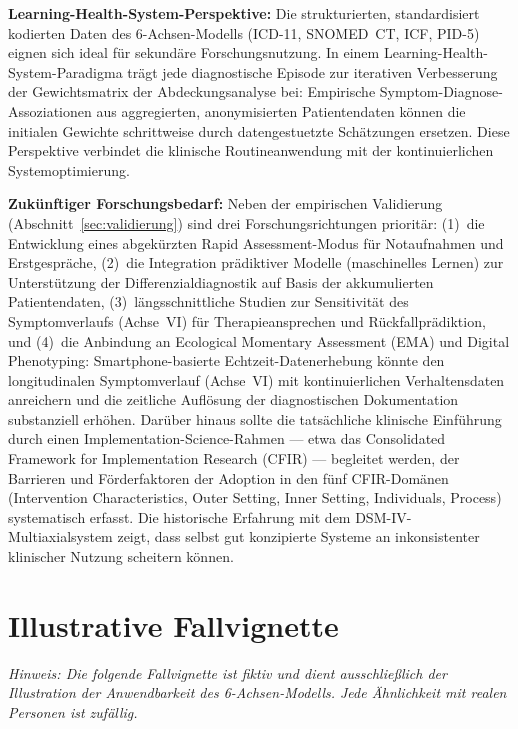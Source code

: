 \documentclass[11pt,a4paper]{article}
\begin{document}
\textbf{Learning-Health-System-Perspektive:} Die strukturierten, standardisiert kodierten Daten des 6-Achsen-Modells (ICD-11, SNOMED~CT, ICF, PID-5) eignen sich ideal f\"ur sekund\"are Forschungsnutzung. In einem Learning-Health-System-Paradigma tr\"agt jede diagnostische Episode zur iterativen Verbesserung der Gewichtsmatrix der Abdeckungsanalyse bei: Empirische Symptom-Diagnose-Assoziationen aus aggregierten, anonymisierten Patientendaten k\"onnen die initialen Gewichte schrittweise durch datengestuetzte Sch\"atzungen ersetzen. Diese Perspektive verbindet die klinische Routineanwendung mit der kontinuierlichen Systemoptimierung.

\textbf{Zuk\"unftiger Forschungsbedarf:} Neben der empirischen Validierung (Abschnitt~\ref{sec:validierung}) sind drei Forschungsrichtungen priorit\"ar: (1)~die Entwicklung eines abgek\"urzten \glqq Rapid Assessment\grqq{}-Modus f\"ur Notaufnahmen und Erstgespr\"ache, (2)~die Integration pr\"adiktiver Modelle (maschinelles Lernen) zur Unterst\"utzung der Differenzialdiagnostik auf Basis der akkumulierten Patientendaten, (3)~l\"angsschnittliche Studien zur Sensitivit\"at des Symptomverlaufs (Achse~VI) f\"ur Therapieansprechen und R\"uckfallpr\"adiktion, und (4)~die Anbindung an Ecological Momentary Assessment (EMA) und Digital Phenotyping: Smartphone-basierte Echtzeit-Datenerhebung k\"onnte den longitudinalen Symptomverlauf (Achse~VI) mit kontinuierlichen Verhaltensdaten anreichern und die zeitliche Aufl\"osung der diagnostischen Dokumentation substanziell erh\"ohen. Dar\"uber hinaus sollte die tats\"achliche klinische Einf\"uhrung durch einen Implementation-Science-Rahmen --- etwa das Consolidated Framework for Implementation Research (CFIR) --- begleitet werden, der Barrieren und F\"orderfaktoren der Adoption in den f\"unf CFIR-Dom\"anen (Intervention Characteristics, Outer Setting, Inner Setting, Individuals, Process) systematisch erfasst. Die historische Erfahrung mit dem DSM-IV-Multiaxialsystem zeigt, dass selbst gut konzipierte Systeme an inkonsistenter klinischer Nutzung scheitern k\"onnen.


\section{Illustrative Fallvignette}
\label{sec:fallvignette}

\textit{Hinweis: Die folgende Fallvignette ist fiktiv und dient ausschlie\ss{}lich der Illustration der Anwendbarkeit des 6-Achsen-Modells. Jede \"Ahnlichkeit mit realen Personen ist zuf\"allig.}
\end{document}
